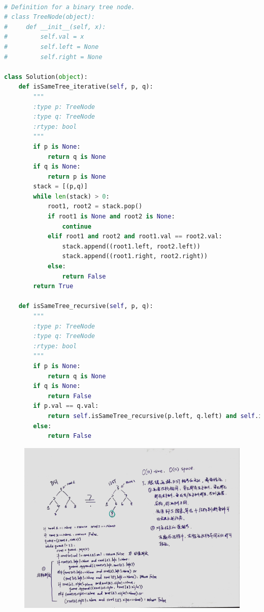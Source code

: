 \documentclass[a4paper,10pt]{article}
\begin{document}
\begin{lstlisting}[language=Python, caption=Problem100. Same Tree]

# Definition for a binary tree node.
# class TreeNode(object):
#     def __init__(self, x):
#         self.val = x
#         self.left = None
#         self.right = None

class Solution(object):
    def isSameTree_iterative(self, p, q):
        """
        :type p: TreeNode
        :type q: TreeNode
        :rtype: bool
        """
        if p is None: 
            return q is None
        if q is None: 
            return p is None
        stack = [(p,q)]
        while len(stack) > 0:
            root1, root2 = stack.pop()
            if root1 is None and root2 is None: 
                continue
            elif root1 and root2 and root1.val == root2.val:
                stack.append((root1.left, root2.left))
                stack.append((root1.right, root2.right))
            else: 
                return False
        return True
        
    def isSameTree_recursive(self, p, q):
        """
        :type p: TreeNode
        :type q: TreeNode
        :rtype: bool
        """
        if p is None: 
            return q is None
        if q is None: 
            return False
        if p.val == q.val:
            return self.isSameTree_recursive(p.left, q.left) and self.isSameTree_recursive(p.right, q.right)
        else:
            return False
\end{lstlisting}

\begin{figure}[h]
    \includegraphics[width=\textwidth]{leetcode100.jpg}
    \centering \\
\end{figure}
\end{document}

